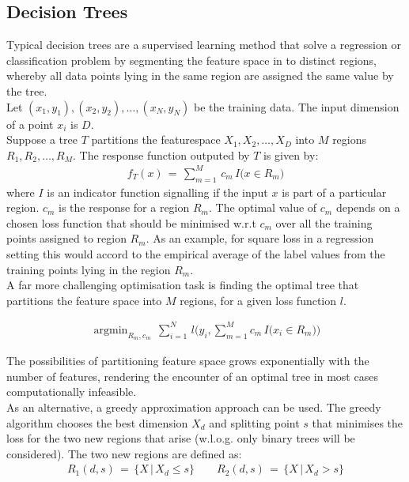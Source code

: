 \documentclass[a4paper, 11pt]{article}
\DeclareMathOperator*{\argmin}{argmin} %
\begin{document}
\subsection{Decision Trees}

Typical decision trees are a supervised learning method that solve a regression or classification problem by segmenting the feature space in to distinct regions, whereby all data points lying in the same region are assigned the same value by the tree. \\

Let ${(x_1,y_1),(x_2, y_2), \ldots, (x_N, y_N)}$ be the training data. The input dimension of a point $x_i$ is $D$.\\

Suppose a tree $T$ partitions the featurespace $X_1, X_2, \ldots, X_D$ into $M$ regions $R_1, R_2, \ldots, R_M$. The response function outputed by $T$ is given by:
\begin{align*}
f_T(x)\, =\, \sum_{m = 1}^{M}\, c_m\, I\big(x \in R_m\big)
\end{align*}
where $I$ is an indicator function signalling if the input $x$ is part of a particular region. $c_m$ is the response for a region $R_m$. The optimal value of $c_m$ depends on a chosen loss function that should be minimised w.r.t $c_m$ over all the training points assigned to region $R_m$. As an example, for square loss in a regression setting this would accord to the empirical average of the label values from the training points lying in the region $R_m$.\\

A far more challenging optimisation task is finding the optimal tree that partitions the feature space into $M$ regions, for a given loss function $l$.

\begin{align*}
\argmin_{R_m, c_m}\, \sum_{i =1}^{N}\, l\big(y_i, \sum_{m = 1}^{M} c_m\, I\big (x_i \in R_m\big )\big )
\end{align*}

The possibilities of partitioning feature space grows exponentially with the number of features, rendering the encounter of an optimal tree in most cases computationally infeasible.\\

As an alternative, a greedy approximation approach can be used. The greedy algorithm chooses the best dimension $X_d$ and splitting point $s$ that minimises the loss for the two new regions that arise (w.l.o.g. only binary trees will be considered). The two new regions are defined as:
\begin{align*}
R_1(d, s)\, =\, \big \{X\, |\, X_d \leq s\big \} \qquad R_2(d, s)\, =\, \big \{X\, |\, X_d > s \big \}
\end{align*}
\end{document}
